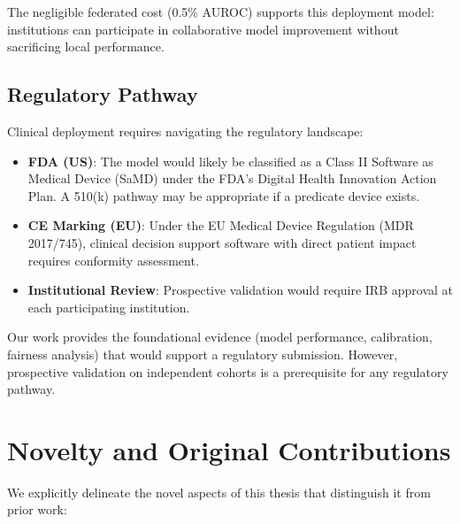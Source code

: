 The negligible federated cost (0.5\% AUROC) supports this deployment model: institutions can participate in collaborative model improvement without sacrificing local performance.

\subsection{Regulatory Pathway}

Clinical deployment requires navigating the regulatory landscape:
\begin{itemize}
\item \textbf{FDA (US)}: The model would likely be classified as a Class II Software as Medical Device (SaMD) under the FDA's Digital Health Innovation Action Plan. A 510(k) pathway may be appropriate if a predicate device exists.
\item \textbf{CE Marking (EU)}: Under the EU Medical Device Regulation (MDR 2017/745), clinical decision support software with direct patient impact requires conformity assessment.
\item \textbf{Institutional Review}: Prospective validation would require IRB approval at each participating institution.
\end{itemize}

Our work provides the foundational evidence (model performance, calibration, fairness analysis) that would support a regulatory submission. However, prospective validation on independent cohorts is a prerequisite for any regulatory pathway.

\section{Novelty and Original Contributions}

We explicitly delineate the novel aspects of this thesis that distinguish it from prior work:

